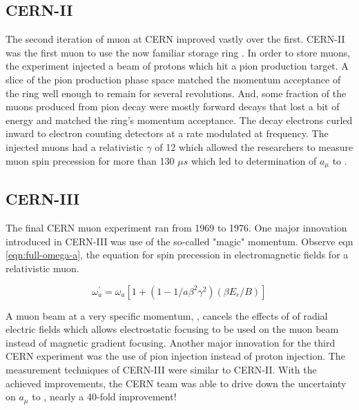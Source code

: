 \subsection{CERN-II}
The second iteration of muon \gmtwo at CERN improved vastly over the first.  CERN-II was the first muon \gmtwo to use the now familiar storage ring \cite{47y-muon-g-2}.  In order to store muons, the experiment injected a beam of protons which hit a pion production target.  A slice of the pion production phase space matched the momentum acceptance of the ring well enough to remain for several revolutions. And, some fraction of the muons produced from pion decay were mostly forward decays that lost a bit of energy and matched the ring's momentum acceptance.  The decay electrons curled inward to electron counting detectors at a rate modulated at \gmtwo frequency.  The injected muons had a relativistic $\gamma$ of 12 which allowed the researchers to measure muon spin precession for more than 130 $\mu s$ which led to determination of $a_\mu$ to .

\subsection{CERN-III}
The final CERN muon \gmtwo experiment ran from 1969 to 1976.  One major innovation introduced in CERN-III was use of the so-called "magic" momentum. Observe eqn \ref{eqn:full-omega-a}, the equation for spin precession in electromagnetic fields for a relativistic muon.

\begin{equation}
\omega^\prime_a = \omega_a[1 + (1 - 1 / a \beta^2 \gamma^2)(\beta E_r / B)]
\label{eqn:full-omega-a}
\end{equation}

A muon beam at a very specific momentum, , cancels the effects of of radial electric fields which allows electrostatic focusing to be used on the muon beam instead of magnetic gradient focusing.  Another major innovation for the third CERN experiment was the use of pion injection instead of proton injection.  The measurement techniques of CERN-III were similar to CERN-II.  With the achieved improvements, the CERN team was able to drive down the uncertainty on $a_\mu$ to , nearly a 40-fold improvement!

